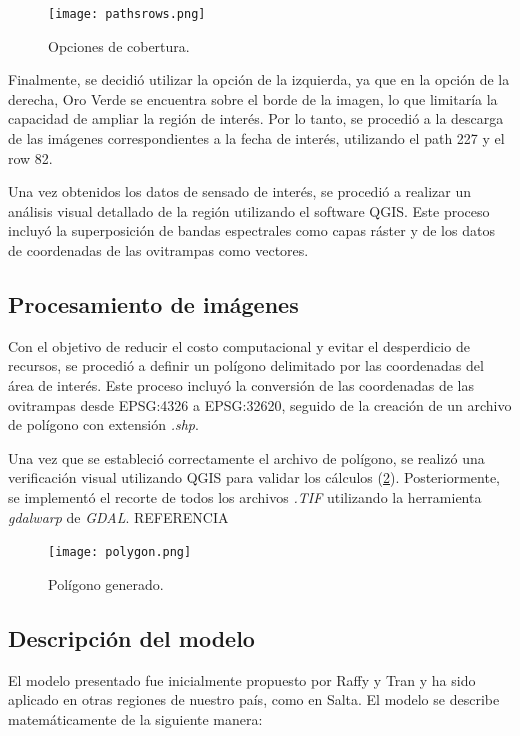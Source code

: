 \begin{figure}[H]
	\texttt{[image: pathsrows.png]}
	\centering
	\caption{Opciones de cobertura.}
	\label{fig:paths-rows}
	
\end{figure}

Finalmente, se decidió utilizar la opción de la izquierda, ya que en la opción de la derecha, Oro Verde se encuentra sobre el borde de la imagen, lo que limitaría la capacidad de ampliar la región de interés. Por lo tanto, se procedió a la descarga de las imágenes correspondientes a la fecha de interés, utilizando el path 227 y el row 82.

Una vez obtenidos los datos de sensado de interés, se procedió a realizar un análisis visual detallado de la región utilizando el software QGIS. Este proceso incluyó la superposición de bandas espectrales como capas ráster y de los datos de coordenadas de las ovitrampas como vectores.

\subsection{Procesamiento de imágenes}


Con el objetivo de reducir el costo computacional y evitar el desperdicio de recursos, se procedió a definir un polígono delimitado por las coordenadas del área de interés. Este proceso incluyó la conversión de las coordenadas de las ovitrampas desde EPSG:4326 a EPSG:32620, seguido de la creación de un archivo de polígono con extensión \textit{.shp}.

Una vez que se estableció correctamente el archivo de polígono, se realizó una verificación visual utilizando QGIS para validar los cálculos (\figurename \ref{fig:polygon}). Posteriormente, se implementó el recorte de todos los archivos \textit{.TIF} utilizando la herramienta \textit{gdalwarp} de \textit{GDAL}. REFERENCIA


\begin{figure}[H]
	\texttt{[image: polygon.png]}
	\centering
	\caption{Polígono generado.}
	\label{fig:polygon}
\end{figure}

\subsection{Descripción del modelo}

El modelo presentado fue inicialmente propuesto por Raffy y Tran y ha sido aplicado en otras regiones de nuestro país, como en Salta. El modelo se describe matemáticamente de la siguiente manera:

